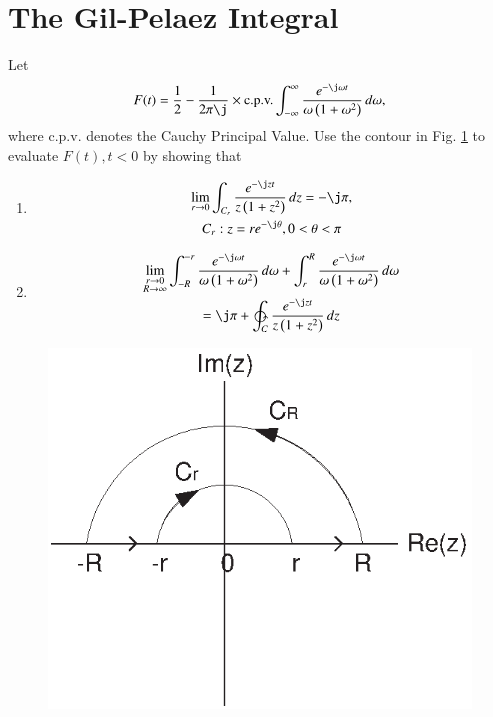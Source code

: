 \documentclass[journal,12pt,twocolumn]{IEEEtran}
\begin{document}
\section{The Gil-Pelaez Integral}
\begin{problem}
Let
\begin{equation}
\label{eq:gil}
F(t) = \frac{1}{2}-\frac{1}{2\pi\j}\times \text{c.p.v.}\int_{-\infty}^{\infty}\frac{e^{-\j\omega t}}{\omega\brak{1+\omega^2}}\,d\omega,
\end{equation}
where c.p.v. denotes the Cauchy Principal Value. Use the contour in Fig. \ref{fig:origin_contour} to evaluate $F(t), t < 0$
by showing that
\begin{enumerate}
\item
\begin{multline}
\lim_{r\to 0}\int_{C_r}\frac{e^{-\j zt}}{z\brak{1+z^2}}\,dz = -\j\pi, 
\\
C_r: z = re^{-\j\theta}, 0 < \theta < \pi
\end{multline}
\item 
\begin{multline}
\lim_{\substack{r\to 0 \\ R \to \infty}}\int_{-R}^{-r}\frac{e^{-\j\omega t}}{\omega\brak{1+\omega^2}}\,d\omega
+
\int_{r}^{R}\frac{e^{-\j\omega t}}{\omega\brak{1+\omega^2}}\,d\omega 
\\
= \j\pi + \ointctrclockwise_{C}\frac{e^{-\j zt}}{z\brak{1+z^2}}\,dz
\end{multline}
\end{enumerate}
\end{problem}	
\begin{figure}[!h]
\centering
\includegraphics[width=\columnwidth]{./figs/origin_contour.ps}
\caption{}
\label{fig:origin_contour}
\end{figure}
\end{document}
